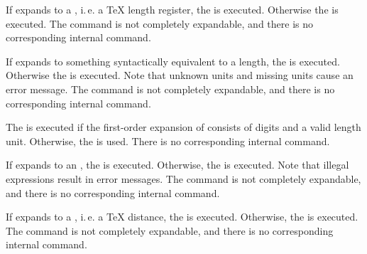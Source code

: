 \begin{Declaration}
\end{Declaration}
If
 expands to a , i.\,e. a \TeX{} length
register, the  is executed. Otherwise the  is executed. The command is not completely expandable, and there
is no corresponding internal command.%
\EndIndexGroup


\begin{Declaration}
\end{Declaration}
If
 expands to something syntactically equivalent to a length,
the  is executed.  Otherwise the  is
executed. Note  that unknown units and missing units
cause an error message. The command is not completely expandable, and there is
no corresponding internal command.%
\EndIndexGroup


\begin{Declaration}
\end{Declaration}
The  is executed if
the first-order expansion of  consists of digits and a valid
length unit. Otherwise, the  is used. There is no
corresponding internal command.%
\EndIndexGroup


\begin{Declaration}
\end{Declaration}
If
 expands to an \eTeX{} ,
the  is executed.  Otherwise, the  is
executed. Note  that illegal expressions result in
error messages. The command is not completely expandable, and there is no
corresponding internal command.%
\EndIndexGroup


\begin{Declaration}
\end{Declaration}
If
 expands to a , i.\,e. a \TeX{} distance, the
 is executed. Otherwise, the  is
executed. The command is not completely expandable, and there is no
corresponding internal command.%
\EndIndexGroup


